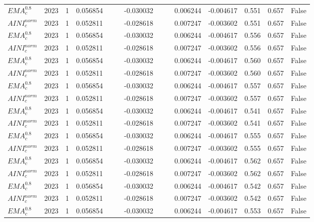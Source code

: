 \begin{tabular}{@{}llrrrrrrrrrlll@{}}
$EMA^{0.8}_{c}$ & 2023 & 1 & 0.056854 &  &  & -0.030032 &  &  & 0.006244 & -0.004617 & 0.551 & 0.657 & False \\
$AINI^{norm}_{c}$ & 2023 & 1 & 0.052811 &  &  & -0.028618 &  &  & 0.007247 & -0.003602 & 0.551 & 0.657 & False \\
$EMA^{0.8}_{c}$ & 2023 & 1 & 0.056854 &  &  & -0.030032 &  &  & 0.006244 & -0.004617 & 0.556 & 0.657 & False \\
$AINI^{norm}_{c}$ & 2023 & 1 & 0.052811 &  &  & -0.028618 &  &  & 0.007247 & -0.003602 & 0.556 & 0.657 & False \\
$EMA^{0.8}_{c}$ & 2023 & 1 & 0.056854 &  &  & -0.030032 &  &  & 0.006244 & -0.004617 & 0.560 & 0.657 & False \\
$AINI^{norm}_{c}$ & 2023 & 1 & 0.052811 &  &  & -0.028618 &  &  & 0.007247 & -0.003602 & 0.560 & 0.657 & False \\
$EMA^{0.8}_{c}$ & 2023 & 1 & 0.056854 &  &  & -0.030032 &  &  & 0.006244 & -0.004617 & 0.557 & 0.657 & False \\
$AINI^{norm}_{c}$ & 2023 & 1 & 0.052811 &  &  & -0.028618 &  &  & 0.007247 & -0.003602 & 0.557 & 0.657 & False \\
$EMA^{0.8}_{c}$ & 2023 & 1 & 0.056854 &  &  & -0.030032 &  &  & 0.006244 & -0.004617 & 0.541 & 0.657 & False \\
$AINI^{norm}_{c}$ & 2023 & 1 & 0.052811 &  &  & -0.028618 &  &  & 0.007247 & -0.003602 & 0.541 & 0.657 & False \\
$EMA^{0.8}_{c}$ & 2023 & 1 & 0.056854 &  &  & -0.030032 &  &  & 0.006244 & -0.004617 & 0.555 & 0.657 & False \\
$AINI^{norm}_{c}$ & 2023 & 1 & 0.052811 &  &  & -0.028618 &  &  & 0.007247 & -0.003602 & 0.555 & 0.657 & False \\
$EMA^{0.8}_{c}$ & 2023 & 1 & 0.056854 &  &  & -0.030032 &  &  & 0.006244 & -0.004617 & 0.562 & 0.657 & False \\
$AINI^{norm}_{c}$ & 2023 & 1 & 0.052811 &  &  & -0.028618 &  &  & 0.007247 & -0.003602 & 0.562 & 0.657 & False \\
$EMA^{0.8}_{c}$ & 2023 & 1 & 0.056854 &  &  & -0.030032 &  &  & 0.006244 & -0.004617 & 0.542 & 0.657 & False \\
$AINI^{norm}_{c}$ & 2023 & 1 & 0.052811 &  &  & -0.028618 &  &  & 0.007247 & -0.003602 & 0.542 & 0.657 & False \\
$EMA^{0.8}_{c}$ & 2023 & 1 & 0.056854 &  &  & -0.030032 &  &  & 0.006244 & -0.004617 & 0.553 & 0.657 & False \\

\end{tabular}
